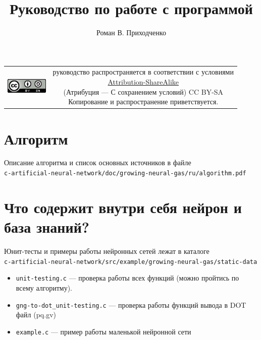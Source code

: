 \documentclass[unicode, 12pt, a4paper,oneside,fleqn]{article}
\author{Роман В. Приходченко}
\title{Руководство по работе с программой}
\begin{document}
\renewcommand\bibname{СПИСОК ЛИТЕРАТУРЫ}
\renewcommand\refname{\centering Список литературы}
\renewcommand\contentsname{\centering Содержание}



\makeatletter %
\maketitle

\begin{table}[ht]
  \begin{tabular}{cc}
    \includegraphics[width=2cm]{../../../CC_BY-SA_88x31.png} &
    \shortstack{руководство распространяется в соответствии с
      условиями\\
      \href{http://creativecommons.org/licenses/by-sa/3.0/}{Attribution-ShareAlike} \\
      (Атрибуция — С сохранением условий) CC BY-SA \\
      Копирование и распространение приветствуется.}
  \end{tabular}
\end{table}

\newpage
\tableofcontents

\section{Алгоритм}
Описание алгоритма и список основных источников в файле\\
\verb'c-artificial-neural-network/doc/growing-neural-gas/ru/algorithm.pdf'


\clearpage
\section{Что содержит внутри себя нейрон и база знаний?}

Юнит-тесты и примеры работы нейронных сетей лежат в каталоге\\
\verb'c-artificial-neural-network/src/example/growing-neural-gas/static-data'
\begin{itemize}
\item \verb'unit-testing.c' --- проверка работы всех функций (можно
  пройтись по всему алгоритму). 
\item \verb'gng-to-dot_unit-testing.c' --- проверка работы функций
  вывода в DOT файл (pq.gv)
\item \verb'example.c' --- пример работы маленькой нейронной сети
\end{itemize}
\end{document}
